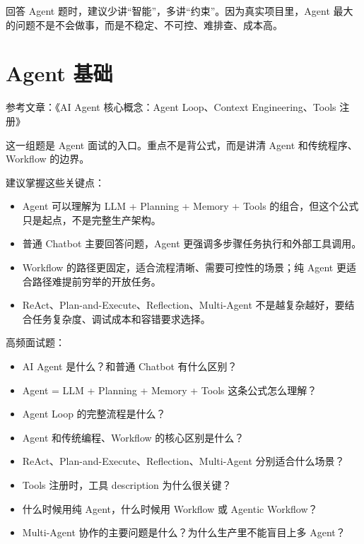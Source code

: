 \documentclass[10pt,a4paper]{ctexart}
\begin{document}
回答 Agent 题时，建议少讲“智能”，多讲“约束”。因为真实项目里，Agent 最大的问题不是不会做事，而是不稳定、不可控、难排查、成本高。



\section{Agent 基础}


参考文章：《AI Agent 核心概念：Agent Loop、Context Engineering、Tools 注册》



这一组题是 Agent 面试的入口。重点不是背公式，而是讲清 Agent 和传统程序、Workflow 的边界。



建议掌握这些关键点：


\begin{itemize}[itemsep=2pt, topsep=4pt]
  \item Agent 可以理解为 LLM + Planning + Memory + Tools 的组合，但这个公式只是起点，不是完整生产架构。
  \item 普通 Chatbot 主要回答问题，Agent 更强调多步骤任务执行和外部工具调用。
  \item Workflow 的路径更固定，适合流程清晰、需要可控性的场景；纯 Agent 更适合路径难提前穷举的开放任务。
  \item ReAct、Plan-and-Execute、Reflection、Multi-Agent 不是越复杂越好，要结合任务复杂度、调试成本和容错要求选择。
\end{itemize}


高频面试题：


\begin{itemize}[itemsep=2pt, topsep=4pt]
  \item AI Agent 是什么？和普通 Chatbot 有什么区别？
  \item Agent = LLM + Planning + Memory + Tools 这条公式怎么理解？
  \item Agent Loop 的完整流程是什么？
  \item Agent 和传统编程、Workflow 的核心区别是什么？
  \item ReAct、Plan-and-Execute、Reflection、Multi-Agent 分别适合什么场景？
  \item Tools 注册时，工具 description 为什么很关键？
  \item 什么时候用纯 Agent，什么时候用 Workflow 或 Agentic Workflow？
  \item Multi-Agent 协作的主要问题是什么？为什么生产里不能盲目上多 Agent？
\end{itemize}
\end{document}
